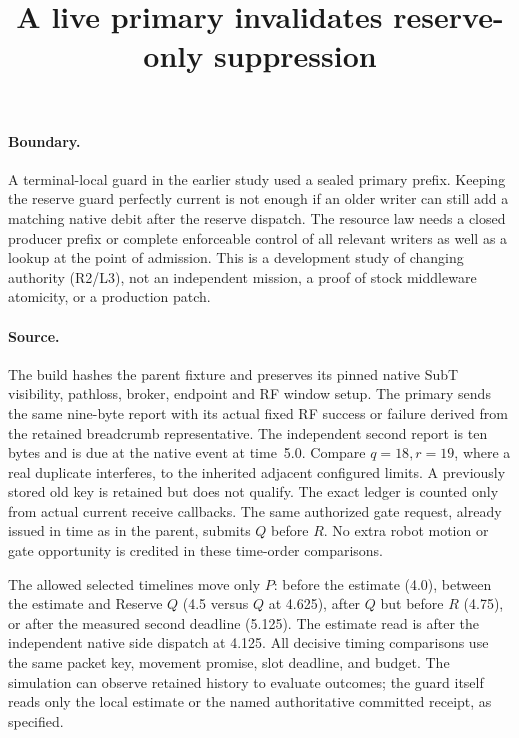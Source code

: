 \documentclass{article}
\title{A live primary invalidates reserve-only suppression}
\author{}
\date{}
\begin{document}
\maketitle

\paragraph{Boundary.}
A terminal-local guard in the earlier study used a sealed primary
prefix. Keeping the reserve guard perfectly current is not enough
if an older writer can still add a matching native debit after the
reserve dispatch. The resource law needs a closed producer prefix
or complete enforceable control of all relevant writers as well
as a lookup at the point of admission. This is a development
study of changing authority (R2/L3), not an independent mission,
a proof of stock middleware atomicity, or a production patch.

\paragraph{Source.}
The build hashes the parent fixture and preserves its pinned native
SubT visibility, pathloss, broker, endpoint and RF window setup.
The primary sends the same nine-byte report with its actual fixed
RF success or failure derived from the retained breadcrumb
representative. The independent second report is ten bytes and
is due at the native event at time~5.0. Compare $q=18,r=19$,
where a real duplicate interferes, to the inherited adjacent
configured limits. A previously stored old key is retained but does
not qualify. The exact ledger is counted only from actual current
receive callbacks. The same authorized gate request, already
issued in time as in the parent, submits $Q$ before $R$.
No extra robot motion or gate opportunity is credited in these
time-order comparisons.

The allowed selected timelines move only $P$: before the estimate
(4.0), between the estimate and Reserve $Q$ (4.5 versus
$Q$ at 4.625), after $Q$ but before $R$ (4.75), or after the
measured second deadline (5.125). The estimate read is after the
independent native side dispatch at 4.125. All decisive timing comparisons
use the same packet key, movement promise, slot deadline, and
budget. The simulation can observe retained history to evaluate
outcomes; the guard itself reads only the local estimate or
the named authoritative committed receipt, as specified.
\end{document}
